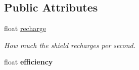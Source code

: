 \subsection*{Public Attributes}
\begin{DoxyCompactItemize}
\item 
float \hyperlink{structShield_a212b4c950825f5d124101f72d96fb7b4}{recharge}\hypertarget{structShield_a212b4c950825f5d124101f72d96fb7b4}{}\label{structShield_a212b4c950825f5d124101f72d96fb7b4}

\begin{DoxyCompactList}\small\item\em How much the shield recharges per second. \end{DoxyCompactList}\item 
float {\bfseries efficiency}\hypertarget{structShield_aa21bfd77a0dad80a00cda7cab913099b}{}\label{structShield_aa21bfd77a0dad80a00cda7cab913099b}


\end{DoxyCompactItemize}
